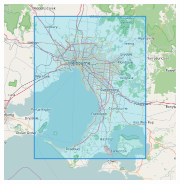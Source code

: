 \begin{figure}[!htbp]
\begin{subfigure}[htbp]{0.3\textwidth}
	\end{subfigure}
	\quad
	\begin{subfigure}[htbp]{0.3\textwidth}
		\centering
		\includegraphics[width=1\linewidth]{figures/melbourne_markers.png}
		\caption{}
		\label{subfig:melbourne_markers}
	\end{subfigure}
	

\end{figure}
